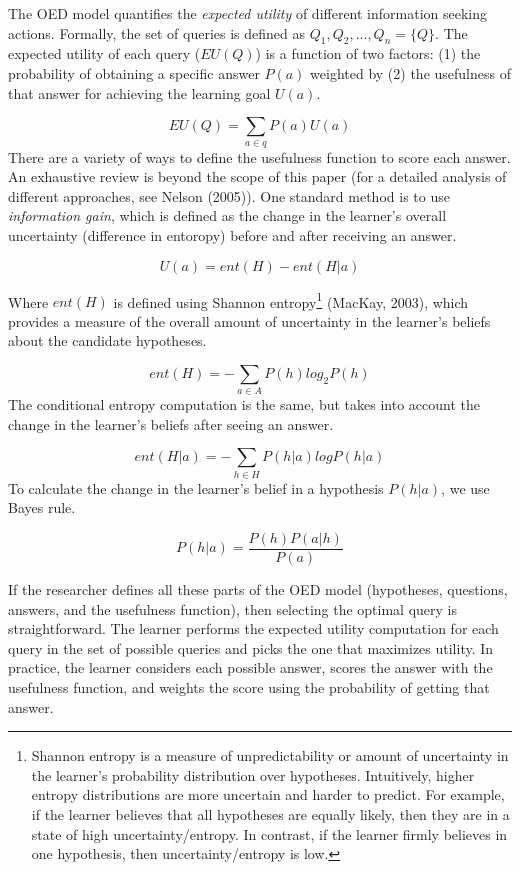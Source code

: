 \documentclass[english,floatsintext,man]{apa6}
\theoremstyle{definition}
\theoremstyle{definition}
\theoremstyle{definition}
\theoremstyle{remark}
\begin{document}
The OED model quantifies the \emph{expected utility} of different
information seeking actions. Formally, the set of queries is defined as
\(Q_1, Q_2,..., Q_n = \{Q\}\). The expected utility of each query
(\(EU(Q)\)) is a function of two factors: (1) the probability of
obtaining a specific answer \(P(a)\) weighted by (2) the usefulness of
that answer for achieving the learning goal \(U(a)\).

\[EU(Q) = \sum_{a\in q}{P(a)U(a)}\] \noindent
There are a variety of ways to define the usefulness function to score
each answer. An exhaustive review is beyond the scope of this paper (for
a detailed analysis of different approaches, see Nelson (2005)). One
standard method is to use \emph{information gain}, which is defined as
the change in the learner's overall uncertainty (difference in entoropy)
before and after receiving an answer.

\[U(a) = ent(H) - ent(H|a)\]

\noindent
Where \(ent(H)\) is defined using Shannon entropy\footnote{Shannon
  entropy is a measure of unpredictability or amount of uncertainty in
  the learner's probability distribution over hypotheses. Intuitively,
  higher entropy distributions are more uncertain and harder to predict.
  For example, if the learner believes that all hypotheses are equally
  likely, then they are in a state of high uncertainty/entropy. In
  contrast, if the learner firmly believes in one hypothesis, then
  uncertainty/entropy is low.} (MacKay, 2003), which provides a measure
of the overall amount of uncertainty in the learner's beliefs about the
candidate hypotheses.

\[ent(H) = -\sum_{a\in A}{P(h)log_2P(h)}\] \noindent
The conditional entropy computation is the same, but takes into account
the change in the learner's beliefs after seeing an answer.

\[ ent(H|a) = -\sum_{h\in H}{P(h|a)logP(h|a)} \] \noindent
To calculate the change in the learner's belief in a hypothesis
\(P(h|a)\), we use Bayes rule.

\[ P(h|a) = \frac{P(h)P(a|h)}{P(a)} \]

\noindent
If the researcher defines all these parts of the OED model (hypotheses,
questions, answers, and the usefulness function), then selecting the
optimal query is straightforward. The learner performs the expected
utility computation for each query in the set of possible queries and
picks the one that maximizes utility. In practice, the learner considers
each possible answer, scores the answer with the usefulness function,
and weights the score using the probability of getting that answer.
\end{document}
